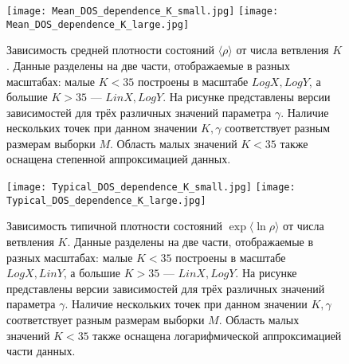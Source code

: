 \begin{figure}[h!]
	\label{fig:Mean_DOS_dependence_from_K}
	\centering
	\texttt{[image: Mean\_DOS\_dependence\_K\_small.jpg]}
	\texttt{[image: Mean\_DOS\_dependence\_K\_large.jpg]}
	\caption{Зависимость средней плотности состояний $\langle \rho \rangle$ от числа ветвления $K$. Данные разделены на две части, отображаемые в разных масштабах: малые $K < 35$ построены в масштабе $LogX, LogY$, а большие $K > 35$ --- $LinX, LogY$. На рисунке представлены версии зависимостей для трёх различных значений параметра $\gamma$. Наличие нескольких точек при данном значении $K, \gamma$ соответствует разным размерам выборки $M$. Область малых значений $K < 35$ также оснащена степенной аппроксимацией данных.}
\end{figure}

\begin{figure}[h!]
	\label{fig:Typical_DOS_dependence_from_K}
	\centering
	\texttt{[image: Typical\_DOS\_dependence\_K\_small.jpg]}
	\texttt{[image: Typical\_DOS\_dependence\_K\_large.jpg]}
	\caption{Зависимость типичной плотности состояний $\exp \langle \ln \rho \rangle$ от числа ветвления $K$. Данные разделены на две части, отображаемые в разных масштабах: малые $K < 35$ построены в масштабе $LogX, LinY$, а большие $K > 35$ --- $LinX, LogY$. На рисунке представлены версии зависимостей для трёх различных значений параметра $\gamma$. Наличие нескольких точек при данном значении $K, \gamma$ соответствует разным размерам выборки $M$. Область малых значений $K < 35$ также оснащена логарифмической аппроксимацией части данных.}
\end{figure}

